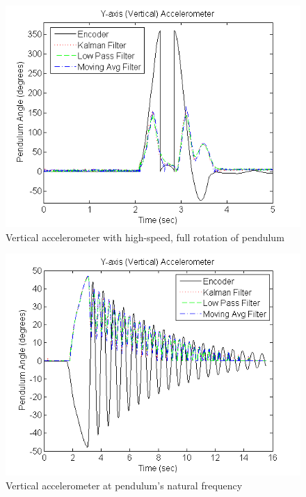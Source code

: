\documentclass{article}
\theoremstyle{plain}
\theoremstyle{definition}
\theoremstyle{remark}
\begin{document}
\begin{figure}[hbt]
\begin{center}
\includegraphics[width = 12cm]{FullRotation_Vertical.png}
\caption{Vertical accelerometer with high-speed, full rotation of pendulum}
\label{full_vertical}
\end{center}
\end{figure}

\begin{figure}[hbt]
\begin{center}
\includegraphics[width = 12cm]{NormalMass_Vertical.png}
\caption{Vertical accelerometer at pendulum's natural frequency}
\label{normal_vertical}
\end{center}
\end{figure}
\end{document}
